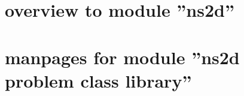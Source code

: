 %

\thispagestyle{plain}
\section{overview to module ''ns2d''}
\renewcommand{\sectitle}{ns2d}


\thispagestyle{plain}
\section{manpages for module ''ns2d problem class library''}
\renewcommand{\sectitle}{ns2d pclib}


%



